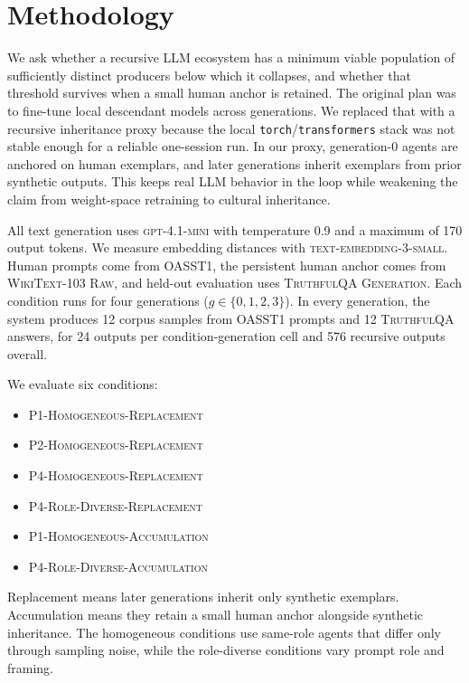 \section{Methodology}
\label{sec:methodology}

We ask whether a recursive LLM ecosystem has a minimum viable population of sufficiently distinct producers below which it collapses, and whether that threshold survives when a small human anchor is retained. The original plan was to fine-tune local descendant models across generations. We replaced that with a recursive inheritance proxy because the local \texttt{torch}/\texttt{transformers} stack was not stable enough for a reliable one-session run. In our proxy, generation-0 agents are anchored on human exemplars, and later generations inherit exemplars from prior synthetic outputs. This keeps real LLM behavior in the loop while weakening the claim from weight-space retraining to cultural inheritance.

All text generation uses \textsc{gpt-4.1-mini} with temperature 0.9 and a maximum of 170 output tokens. We measure embedding distances with \textsc{text-embedding-3-small}. Human prompts come from \textsc{OASST1}, the persistent human anchor comes from \textsc{WikiText-103 Raw}, and held-out evaluation uses \textsc{TruthfulQA Generation}. Each condition runs for four generations ($g \in \{0,1,2,3\}$). In every generation, the system produces 12 corpus samples from \textsc{OASST1} prompts and 12 \textsc{TruthfulQA} answers, for 24 outputs per condition-generation cell and 576 recursive outputs overall.

We evaluate six conditions:
\begin{itemize}[leftmargin=*,itemsep=0pt,topsep=2pt]
    \item \textsc{P1-Homogeneous-Replacement}
    \item \textsc{P2-Homogeneous-Replacement}
    \item \textsc{P4-Homogeneous-Replacement}
    \item \textsc{P4-Role-Diverse-Replacement}
    \item \textsc{P1-Homogeneous-Accumulation}
    \item \textsc{P4-Role-Diverse-Accumulation}
\end{itemize}
Replacement means later generations inherit only synthetic exemplars. Accumulation means they retain a small human anchor alongside synthetic inheritance. The homogeneous conditions use same-role agents that differ only through sampling noise, while the role-diverse conditions vary prompt role and framing.

